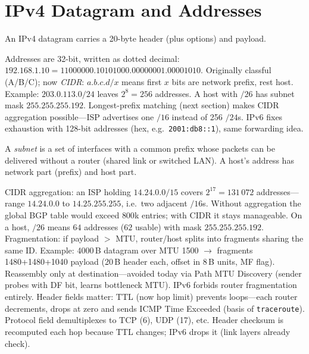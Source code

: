 \section{IPv4 Datagram and Addresses}\label{sec:ipv4}
An IPv4 datagram carries a 20-byte header (plus options) and payload.
\begin{center}
\end{center}
Addresses are 32-bit, written as dotted decimal: $192.168.1.10 = 11000000.10101000.00000001.00001010$. Originally classful (A/B/C); now \emph{CIDR}: $a.b.c.d/x$ means first $x$ bits are network prefix, rest host. Example: $203.0.113.0/24$ leaves $2^{8}=256$ addresses. A host with $/26$ has subnet mask $255.255.255.192$. Longest-prefix matching (next section) makes CIDR aggregation possible---ISP advertises one $/16$ instead of 256 $/24$s. IPv6 fixes exhaustion with 128-bit addresses (hex, e.g.\ \texttt{2001:db8::1}), same forwarding idea.
\begin{definition}[Subnet]\label{def:subnet}
A \emph{subnet} is a set of interfaces with a common prefix whose packets can be delivered without a router (shared link or switched LAN). A host's address has network part (prefix) and host part.
\end{definition}
CIDR aggregation: an ISP holding $14.24.0.0/15$ covers $2^{17}=131\,072$ addresses---range $14.24.0.0$ to $14.25.255.255$, i.e.\ two adjacent $/16$s. Without aggregation the global BGP table would exceed $800$k entries; with CIDR it stays manageable. On a host, $/26$ means $64$ addresses ($62$ usable) with mask $255.255.255.192$.
Fragmentation: if payload $>$ MTU, router/host splits into fragments sharing the same ID. Example: 4000\,B datagram over MTU 1500 $\to$ fragments 1480+1480+1040 payload (20\,B header each, offset in 8\,B units, MF flag). Reassembly only at destination---avoided today via Path MTU Discovery (sender probes with DF bit, learns bottleneck MTU). IPv6 forbids router fragmentation entirely.
Header fields matter: TTL (now hop limit) prevents loops---each router decrements, drops at zero and sends ICMP Time Exceeded (basis of \texttt{traceroute}). Protocol field demultiplexes to TCP (6), UDP (17), etc. Header checksum is recomputed each hop because TTL changes; IPv6 drops it (link layers already check).
